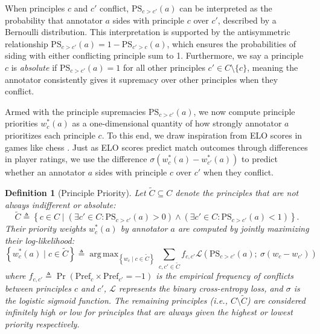 \documentclass{article}
\newtheorem{definition}{Definition}
\DeclareMathOperator*{\argmax}{arg\,max}
\begin{document}
When principles $c$ and $c'$ conflict, $\text{PS}_{c > c'}(a)$ can be interpreted as the probability that annotator $a$ sides with principle $c$ over $c'$, described by a Bernoulli distribution. This interpretation is supported by the antisymmetric relationship $\text{PS}_{c > c'}(a) = 1 - \text{PS}_{c' > c}(a)$, which ensures the probabilities of siding with either conflicting principle sum to 1. Furthermore, we say a principle $c$ is \textit{absolute} if $\text{PS}_{c > c'}(a) = 1$ for all other principles $c' \in C \setminus \{c\}$, meaning the annotator consistently gives it supremacy over other principles when they conflict.

Armed with the principle supremacies $\text{PS}_{c > c'}(a)$, we now compute principle priorities $w^*_c(a)$ as a one-dimensional quantity of how strongly annotator $a$ prioritizes each principle $c$. To this end, we draw inspiration from ELO scores in games like chess \cite{elo1978rating,ebtekar2021elo}. Just as ELO scores predict match outcomes through differences in player ratings, we use the difference $\sigma(w^*_c(a) - w^*_{c'}(a))$ to predict whether an annotator $a$ sides with principle $c$ over $c'$ when they conflict.

\begin{definition}[Principle Priority]\label{def:principles_priority}
Let $\tilde{C} \subseteq C$ denote the principles that are \textit{not} always indifferent or absolute:
\begin{equation}
\tilde{C} \triangleq \left\{c \in C \mid \left(\exists c' \in C : \text{PS}_{c > c'}(a) > 0\right) \wedge \left(\exists c' \in C : \text{PS}_{c > c'}(a) < 1\right)\right\}.
\end{equation}
Their priority weights $w^*_c(a)$ by annotator $a$ are  computed by jointly maximizing their log-likelihood:
\begin{equation}
\left\{w^*_c(a) \mid c \in \tilde{C} \right\} \triangleq \argmax_{\left\{w_c \mid c \in \tilde{C}\right\}} \sum_{c,c' \in \tilde{C}} f_{c,c'} \mathcal{L}(\text{PS}_{c > c'}(a); \: \sigma(w_c - w_{c'}))
\label{eq:optimal_weights}
\end{equation}
where $f_{c,c'} \triangleq \Pr(\text{Pref}_c \times \text{Pref}_{c'} = -1)$ is the empirical frequency of conflicts between principles $c$ and $c'$, $\mathcal{L}$ represents the binary cross-entropy loss, and $\sigma$ is the logistic sigmoid function. The remaining principles (i.e., $C \setminus \tilde{C}$) are considered infinitely high or low for principles that are always given the highest or lowest priority respectively.
\end{definition}
\end{document}
